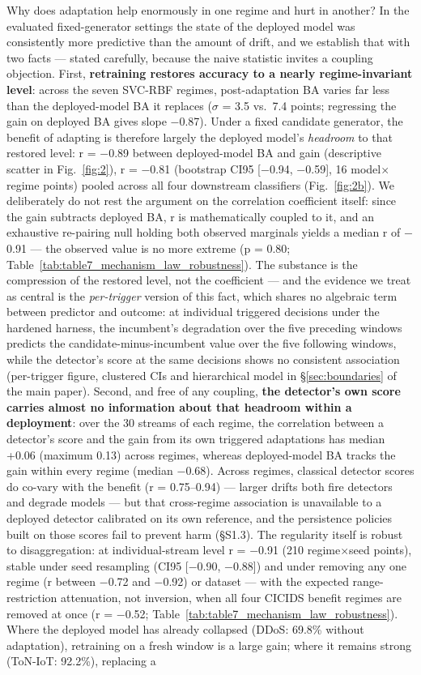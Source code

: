 \documentclass[a4paper,11pt]{article}
\begin{document}
Why does adaptation help enormously in one regime and hurt in another? In the evaluated fixed-generator settings the state of the deployed model was consistently more predictive than the amount of drift, and we establish that with two facts --- stated carefully, because the naive statistic invites a coupling objection. First, \textbf{retraining restores accuracy to a nearly regime-invariant level}: across the seven SVC-RBF regimes, post-adaptation BA varies far less than the deployed-model BA it replaces ($\sigma$ = 3.5 vs.\ 7.4 points; regressing the gain on deployed BA gives slope $-$0.87). Under a fixed candidate generator, the benefit of adapting is therefore largely the deployed model's \emph{headroom} to that restored level: r = $-$0.89 between deployed-model BA and gain (descriptive scatter in Fig.~\ref{fig:2}), r = $-$0.81 (bootstrap CI95 [$-$0.94, $-$0.59], 16 model$\times$regime points) pooled across all four downstream classifiers (Fig.~\ref{fig:2b}). We deliberately do not rest the argument on the correlation coefficient itself: since the gain subtracts deployed BA, r is mathematically coupled to it, and an exhaustive re-pairing null holding both observed marginals yields a median r of $-$0.91 --- the observed value is no more extreme (p = 0.80; Table~\ref{tab:table7_mechanism_law_robustness}). The substance is the compression of the restored level, not the coefficient --- and the evidence we treat as central is the \emph{per-trigger} version of this fact, which shares no algebraic term between predictor and outcome: at individual triggered decisions under the hardened harness, the incumbent's degradation over the five preceding windows predicts the candidate-minus-incumbent value over the five following windows, while the detector's score at the same decisions shows no consistent association (per-trigger figure, clustered CIs and hierarchical model in \S\ref{sec:boundaries} of the main paper). Second, and free of any coupling, \textbf{the detector's own score carries almost no information about that headroom within a deployment}: over the 30 streams of each regime, the correlation between a detector's score and the gain from its own triggered adaptations has median +0.06 (maximum 0.13) across regimes, whereas deployed-model BA tracks the gain within every regime (median $-$0.68). Across regimes, classical detector scores do co-vary with the benefit (r = 0.75--0.94) --- larger drifts both fire detectors and degrade models --- but that cross-regime association is unavailable to a deployed detector calibrated on its own reference, and the persistence policies built on those scores fail to prevent harm (\S S1.3). The regularity itself is robust to disaggregation: at individual-stream level r = $-$0.91 (210 regime$\times$seed points), stable under seed resampling (CI95 [$-$0.90, $-$0.88]) and under removing any one regime (r between $-$0.72 and $-$0.92) or dataset --- with the expected range-restriction attenuation, not inversion, when all four CICIDS benefit regimes are removed at once (r = $-$0.52; Table~\ref{tab:table7_mechanism_law_robustness}). Where the deployed model has already collapsed (DDoS: 69.8\% without adaptation), retraining on a fresh window is a large gain; where it remains strong (ToN-IoT: 92.2\%), replacing a 
\end{document}

